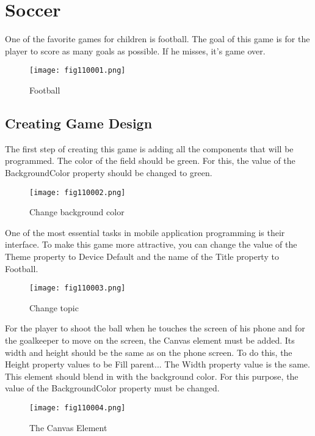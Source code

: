 \chapter{Soccer}

One of the favorite games for children is football. The goal of this game is for the player to score as many goals as possible. If he misses, it's game over.

\begin{figure}[H]
   \centering
   \texttt{[image: fig110001.png]}
   \caption{Football}
\label{fig110001}
\end{figure}

\section{Creating Game Design}
The first step of creating this game is adding all the components that will be programmed. The color of the field should be green. For this, the value of the BackgroundColor property should be changed to green.

\begin{figure}[H]
   \centering
   \texttt{[image: fig110002.png]}
   \caption{Change background color}
\label{fig110002}
\end{figure}

One of the most essential tasks in mobile application programming is their interface. To make this game more attractive, you can change the value of the Theme property to Device Default and the name of the Title property to Football.

\begin{figure}[H]
   \centering
   \texttt{[image: fig110003.png]}
   \caption{Change topic}
\label{fig110003}
\end{figure}

For the player to shoot the ball when he touches the screen of his phone and for the goalkeeper to move on the screen, the Canvas element must be added. Its width and height should be the same as on the phone screen. To do this, the Height property values to be Fill parent... The Width property value is the same. This element should blend in with the background color. For this purpose, the value of the BackgroundColor property must be changed.

\begin{figure}[H]
   \centering
   \texttt{[image: fig110004.png]}
   \caption{The Canvas Element}
\label{fig110004}
\end{figure}

